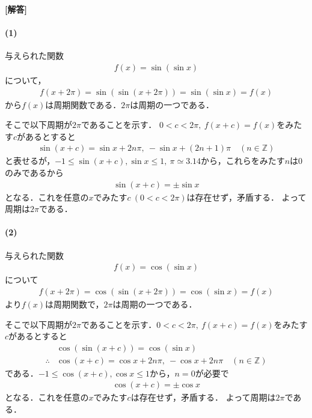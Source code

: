 \documentclass[../../main.tex]{subfiles}
\begin{document}
\begin{oframed}
  
\end{oframed}

{\bf [解答]}
\paragraph{(1)}

与えられた関数
\begin{align}
  f(x) = \sin(\sin x) \label{eq:1}
\end{align}
について，
\begin{align}
  f(x+2\pi) = \sin(\sin(x+2\pi)) = \sin(\sin x) = f(x)
\end{align}
から$f(x)$は周期関数である．$2\pi$は周期の一つである．

そこで以下周期が$2\pi$であることを示す．
$0 < c < 2\pi, \ f(x+c) = f(x)$をみたす$c$があるとすると
\begin{align}
  \sin(x+c) = \sin x + 2n\pi, \ -\sin x + (2n+1)\pi \quad (n \in \mathbb{Z})
\end{align}
と表せるが，$-1 \le \sin(x+c), \sin x \le 1, \ \pi \simeq 3.14$から，これらをみたす$n$は$0$のみであるから
\begin{align}
  \sin(x+c) = \pm \sin x
\end{align}
となる．これを任意の$x$でみたす$c \ (0 < c < 2\pi)$は存在せず，矛盾する．
よって周期は$2\pi$である．

\paragraph{(2)}

与えられた関数
\begin{align}
  f(x) = \cos(\sin x)
\end{align}
について
\begin{align}
  f(x+2\pi) = \cos(\sin (x+2\pi)) = \cos(\sin x) = f(x)
\end{align}
より$f(x)$は周期関数で，$2\pi$は周期の一つである．

そこで以下周期が$2\pi$であることを示す．$0 < c < 2\pi, \ f(x+c) = f(x)$をみたす$c$があるとすると
\begin{align}
  & \cos(\sin(x+c)) = \cos(\sin x) \\
  \therefore
  & \cos(x+c) = \cos x + 2n\pi, \ -\cos x + 2n\pi \quad (n \in \mathbb{Z})
\end{align}
である．$-1 \le \cos(x+c), \cos x \le 1$から，$n=0$が必要で
\begin{align}
  \cos(x+c) = \pm \cos x
\end{align}
となる．これを任意の$x$でみたす$c$は存在せず，矛盾する．
よって周期は$2\pi$である．
\end{document}

